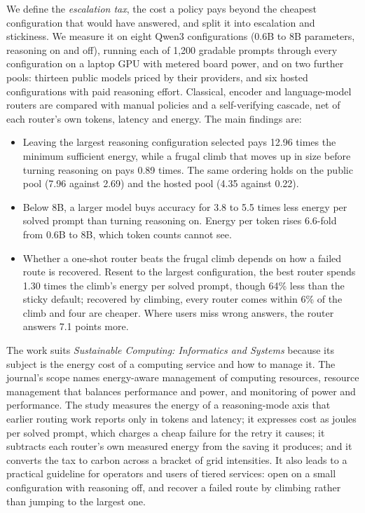 \documentclass[11pt]{article}
\begin{document}
We define the \emph{escalation tax}, the cost a policy pays beyond the cheapest
configuration that would have answered, and split it into escalation and
stickiness. We measure it on eight Qwen3 configurations (0.6B to 8B parameters,
reasoning on and off), running each of 1{,}200 gradable prompts through every
configuration on a laptop GPU with metered board power, and on two further
pools: thirteen public models priced by their providers, and six hosted
configurations with paid reasoning effort. Classical, encoder and
language-model routers are compared with manual policies and a self-verifying
cascade, net of each router's own tokens, latency and energy. The main findings
are:
\begin{itemize}\setlength{\itemsep}{0.15em}
  \item Leaving the largest reasoning configuration selected pays 12.96 times
        the minimum sufficient energy, while a frugal climb that moves up in
        size before turning reasoning on pays 0.89 times. The same ordering
        holds on the public pool (7.96 against 2.69) and the hosted pool (4.35
        against 0.22).
  \item Below 8B, a larger model buys accuracy for 3.8 to 5.5 times less energy
        per solved prompt than turning reasoning on. Energy per token rises
        6.6-fold from 0.6B to 8B, which token counts cannot see.
  \item Whether a one-shot router beats the frugal climb depends on how a failed
        route is recovered. Resent to the largest configuration, the best router
        spends 1.30 times the climb's energy per solved prompt, though 64\% less
        than the sticky default; recovered by climbing, every router comes
        within 6\% of the climb and four are cheaper. Where users miss wrong
        answers, the router answers 7.1 points more.
\end{itemize}

The work suits \emph{Sustainable Computing: Informatics and Systems} because
its subject is the energy cost of a computing service and how to manage it. The
journal's scope names energy-aware management of computing resources, resource
management that balances performance and power, and monitoring of power and
performance. The study measures the energy of a reasoning-mode axis that
earlier routing work reports only in tokens and latency; it expresses cost as
joules per solved prompt, which charges a cheap failure for the retry it
causes; it subtracts each router's own measured energy from the saving it
produces; and it converts the tax to carbon across a bracket of grid
intensities. It also leads to a practical guideline for operators and users of
tiered services: open on a small configuration with reasoning off, and recover
a failed route by climbing rather than jumping to the largest one.
\end{document}
